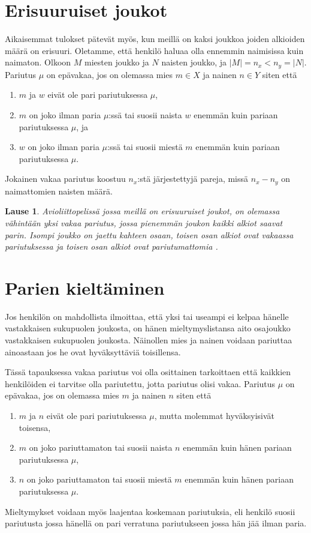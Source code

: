 \documentclass[finnish]{tktltiki2}
\newtheorem{lau}{Lause}
\theoremstyle{definition}
\theoremstyle{remark}
\begin{document}
\section{Erisuuruiset joukot}
Aikaisemmat tulokset pätevät myös, kun meillä on kaksi joukkoa joiden alkioiden määrä on erisuuri. Oletamme, että henkilö haluaa olla ennemmin naimisissa kuin naimaton.
Olkoon $M$ miesten joukko ja $N$ naisten joukko, ja $|M| = n_x < n_y = |N|$. Pariutus $\mu$ on epävakaa, jos on olemassa mies $m \in X$ ja nainen $n \in Y$ siten että

\begin{enumerate}
	\item $m$ ja $w$ eivät ole pari pariutuksessa $\mu$,
	\item $m$ on joko ilman paria $\mu$:ssä tai suosii naista $w$ enemmän kuin pariaan pariutuksessa $\mu$, ja
	\item $w$ on joko ilman paria $\mu$:ssä tai suosii miestä $m$ enemmän kuin pariaan pariutuksessa $\mu$.
\end{enumerate}
Jokainen vakaa pariutus koostuu $n_x$:stä järjestettyjä pareja, missä $n_x - n_y$ on naimattomien naisten määrä.

\begin{lau}
Avioliittopelissä jossa meillä on erisuuruiset joukot, on olemassa vähintään yksi vakaa pariutus, jossa pienemmän joukon kaikki alkiot saavat parin. Isompi joukko on jaettu kahteen osaan, toisen osan alkiot ovat vakaassa pariutuksessa ja toisen osan alkiot ovat pariutumattomia \cite[p. 26]{gusfield1989stable}.
\end{lau}

\section{Parien kieltäminen}
Jos henkilön on mahdollista ilmoittaa, että yksi tai useampi ei kelpaa hänelle vastakkaisen sukupuolen joukosta, on hänen mieltymyslistansa aito osajoukko vastakkaisen sukupuolen joukosta. Näinollen mies ja nainen voidaan pariuttaa ainoastaan jos he ovat hyväksyttäviä toisillensa.

Tässä tapauksessa vakaa pariutus voi olla osittainen tarkoittaen että kaikkien henkilöiden ei tarvitse olla pariutettu, jotta pariutus olisi vakaa. Pariutus $\mu$ on epävakaa, jos on olemassa mies $m$ ja nainen $n$ siten että
\begin{enumerate}
	\item $m$ ja $n$ eivät ole pari pariutuksessa $\mu$, mutta molemmat hyväksyisivät toisensa,
	\item $m$ on joko pariuttamaton tai suosii naista $n$ enemmän kuin hänen pariaan pariutuksessa $\mu$,
	\item $n$ on joko pariuttamaton tai suosii miestä $m$ enemmän kuin hänen pariaan pariutuksessa $\mu$.
\end{enumerate} 
Mieltymykset voidaan myös laajentaa koskemaan pariutuksia, eli henkilö suosii pariutusta jossa hänellä on pari verratuna pariutukseen jossa hän jää ilman paria.
\end{document}
